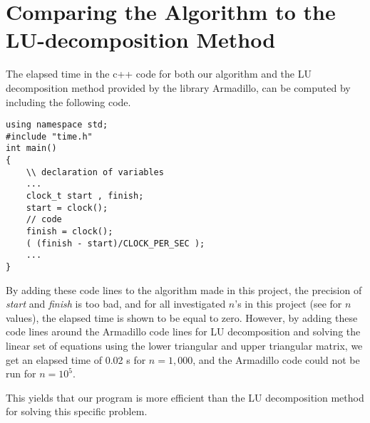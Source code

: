\section{Comparing the Algorithm to the LU-decomposition Method}
\label{sec:CompareAlgToLU}

The elapsed time in the c++ code for both our algorithm and the LU decomposition method provided by the library Armadillo, can be computed by including the following code.

\begin{lstlisting}
using namespace std;
#include "time.h"
int main()
{
	\\ declaration of variables
	...
	clock_t start , finish;
	start = clock();
	// code
	finish = clock();
	( (finish - start)/CLOCK_PER_SEC );
	...
}
\end{lstlisting}
By adding these code lines to the algorithm made in this project, the precision of \textit{start} and \textit{finish} is too bad, and for all investigated $n$'s in this project (see  for $n$ values), the elapsed time is shown to be equal to zero. 
However, by adding these code lines around the Armadillo code lines for LU decomposition and solving the linear set of equations using the lower triangular and upper triangular matrix, we get an elapsed time of 0.02 s for $n=1,000$, and the Armadillo code could not be run for $n=10^5$.

This yields that our program is more efficient than the LU decomposition method for solving this specific problem. 